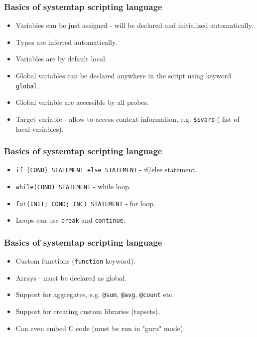 \documentclass[10pt,utf8]{beamer}
\begin{document}
\begin{frame}
    \frametitle{Basics of systemtap scripting language}
    \begin{itemize}
        \item Variables can be just assigned - will be declared and initialized automatically.
        \item Types are inferred automatically.
        \item Variables are by default local.
        \item Global variables can be declared anywhere in the script using keyword \texttt{global}.
        \item Global variable are accessible by all probes.
        \item Target variable - allow to access context information, e.g. \texttt{\$\$vars} ( list of local variables).
    \end{itemize}

\end{frame}
    
\begin{frame}
    \frametitle{Basics of systemtap scripting language}
    \begin{itemize}
        \item \texttt{if (COND) STATEMENT else STATEMENT} - if/else statement.
        \item \texttt{while(COND) STATEMENT} - while loop.
        \item \texttt{for(INIT; COND; INC) STATEMENT} - for loop.
        \item Loops can use \texttt{break} and \texttt{continue}.
    \end{itemize}
\end{frame}

\begin{frame}
    \frametitle{Basics of systemtap scripting language}
    \begin{itemize}
        \item Custom functions (\texttt{function} keyword).
        \item Arrays - must be declared as global.
        \item Support for aggregates, e.g. \texttt{@sum}, \texttt{@avg}, \texttt{@count} etc.
        \item Support for creating custom libraries (tapsets).
        \item Can even embed C code (must be run in "guru" mode).
    \end{itemize}
\end{frame}
\end{document}
